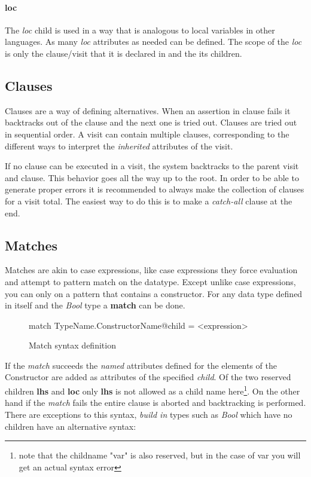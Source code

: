 \paragraph{loc}
The \emph{loc} child is used in a way that is analogous to local variables in other languages. As many \emph{loc} attributes as needed can be defined. The scope of the \emph{loc} is only the clause/visit that it is declared in and the its children.

\subsection{Clauses}
Clauses are a way of defining alternatives. When an assertion in clause fails  it backtracks out of the clause and the next one is tried out. Clauses are tried out in sequential order. A visit can contain multiple clauses, corresponding to the different ways to interpret the \emph{inherited} attributes of the visit.

If no clause can be executed in a visit, the system backtracks to the parent visit and clause. This behavior goes all the way up to the root. In order to be able to generate proper errors it is recommended to always make the collection of clauses for a visit total. The easiest way to do this is to make a \emph{catch-all} clause at the end.

\subsection{Matches}
Matches are akin to case expressions, like case expressions they force evaluation and attempt to pattern match on the datatype. Except unlike case expressions, you can only on a pattern that contains a constructor. For any data type defined in \rcore itself and the \emph{Bool} type a \textbf{match} can be done.

\begin{figure}[h!]
\begin{code}
match TypeName.ConstructorName@child  = <expression>
\end{code}
\caption{Match syntax definition}
\label{match:syntax}
\end{figure}

If the \emph{match} succeeds the \emph{named} attributes defined for the elements of the Constructor are added as attributes of the specified \emph{child}. Of the two reserved children \textbf{lhs} and \textbf{loc} only \textbf{lhs} is not allowed as a child name here\footnote{note that the childname "var" is also reserved, but in the case of var you will get an actual syntax error}. On the other hand if the \emph{match} fails the entire clause is aborted and backtracking is performed.
There are exceptions to this syntax, \emph{build in} types such as \emph{Bool} which have no children have an alternative syntax:

